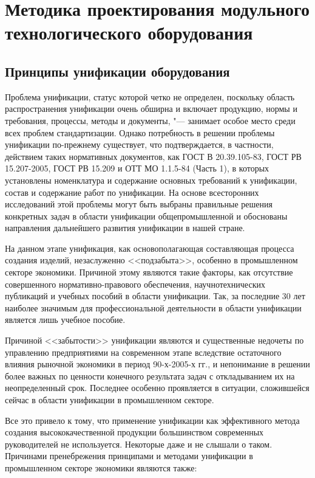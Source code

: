 \chapter{Методика проектирования модульного технологического оборудования}\label{ch:ch2}

\section{Принципы унификации оборудования}

Проблема унификации, статус которой четко не определен, поскольку область распространения унификации очень обширна и включает продукцию, нормы и требования, процессы, методы и документы, "--- занимает особое место среди всех проблем стандартизации. Однако потребность в решении проблемы унификации по-прежнему существует, что подтверждается, в частности, действием таких нормативных документов, как ГОСТ В 20.39.105-83, ГОСТ РВ 15.207-2005, ГОСТ РВ 15.209 и ОТТ МО 1.1.5-84 (Часть 1), в которых установлены номенклатура и содержание основных требований к унификации, состав и содержание работ по унификации. На основе всесторонних исследований этой проблемы могут быть выбраны правильные решения конкретных задач в области унификации общепромышленной и обоснованы направления дальнейшего развития унификации в нашей стране.

На данном этапе унификация, как основополагающая составляющая процесса создания изделий, незаслуженно <<подзабыта>>, особенно в промышленном секторе экономики. Причиной этому являются такие факторы, как отсутствие совершенного нормативно-правового обеспечения, научнотехнических публикаций и учебных пособий в области унификации. Так, за последние 30 лет наиболее значимым для профессиональной деятельности в области унификации является лишь учебное пособие.

Причиной <<забытости>> унификации являются и существенные недочеты по управлению предприятиями на современном этапе вследствие остаточного влияния рыночной экономики в период 90-х-2005-х гг., и непонимание в решении более важных по ценности конечного результата задач с откладыванием их на неопределенный срок. Последнее особенно проявляется в ситуации, сложившейся сейчас в области унификации в промышленном секторе.

Все это привело к тому, что применение унификации как эффективного метода создания высококачественной продукции большинством современных руководителей не используется. Некоторые даже и не слышали о таком. Причинами пренебрежения принципами и методами унификации в промышленном секторе экономики являются также:

